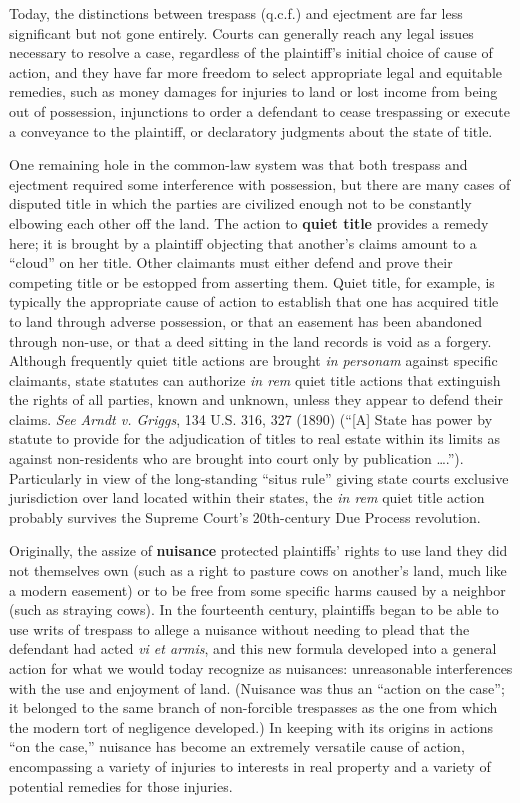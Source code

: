 Today, the distinctions between trespass (q.c.f.) and ejectment are far less
significant but not gone entirely. Courts can generally reach any legal issues
necessary to resolve a case, regardless of the plaintiff's initial choice of
cause of action, and they have far more freedom to select appropriate legal and
equitable remedies, such as money damages for injuries to land or lost income
from being out of possession, injunctions to order a defendant to cease
trespassing or execute a conveyance to the plaintiff, or declaratory judgments
about the state of title.

One remaining hole in the common-law system was that both trespass and ejectment
required some interference with possession, but there are many cases of
disputed title in which the parties are civilized enough not to be constantly
elbowing each other off the land. The action to \textbf{quiet title} provides a
remedy here; it is brought by a plaintiff objecting that another's claims
amount to a ``cloud'' on her title. Other claimants must either defend and
prove their competing title or be estopped from asserting them. Quiet title,
for example, is typically the appropriate cause of action to establish that one
has acquired title to land through adverse possession, or that an easement has
been abandoned through non-use, or that a deed sitting in the land records is
void as a forgery. Although frequently quiet title actions are brought
\textit{in personam} against specific claimants, state statutes can authorize
\textit{in rem} quiet title actions that extinguish the rights of all parties,
known and unknown, unless they appear to defend their claims. \textit{See}
\textit{Arndt v. Griggs}, 134 U.S. 316, 327 (1890) (``[A] State has power by
statute to provide for the adjudication of titles to real estate within its
limits as against non-residents who are brought into court only by publication
\ldots.''). Particularly in view of the long-standing ``situs rule'' giving
state courts exclusive jurisdiction over land located within their states, the
\textit{in rem} quiet title action probably survives the Supreme Court's
20th-century Due Process revolution.

Originally, the assize of \textbf{nuisance} protected plaintiffs' rights to use
land they did not themselves own (such as a right to pasture cows on another's
land, much like a modern easement) or to be free from some specific harms
caused by a neighbor (such as straying cows). In the fourteenth century,
plaintiffs began to be able to use writs of trespass to allege a nuisance
without needing to plead that the defendant had acted \textit{vi et armis}, and
this new formula developed into a general action for what we would today
recognize as nuisances: unreasonable interferences with the use and enjoyment
of land. (Nuisance was thus an ``action on the case''; it belonged to the same
branch of non-forcible trespasses as the one from which the modern tort of
negligence developed.) In keeping with its origins in actions ``on the case,''
nuisance has become an extremely versatile cause of action, encompassing a
variety of injuries to interests in real property and a variety of potential
remedies for those injuries.

